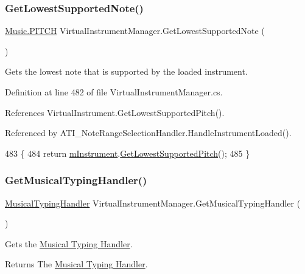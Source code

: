 \subsubsection{\texorpdfstring{Get\+Lowest\+Supported\+Note()}{GetLowestSupportedNote()}}
{\footnotesize\ttfamily \hyperlink{group___music_enums_ga508f69b199ea518f935486c990edac1d}{Music.\+P\+I\+T\+CH} Virtual\+Instrument\+Manager.\+Get\+Lowest\+Supported\+Note (\begin{DoxyParamCaption}{ }\end{DoxyParamCaption})}



Gets the lowest note that is supported by the loaded instrument. 



Definition at line 482 of file Virtual\+Instrument\+Manager.\+cs.



References Virtual\+Instrument.\+Get\+Lowest\+Supported\+Pitch().



Referenced by A\+T\+I\+\_\+\+Note\+Range\+Selection\+Handler.\+Handle\+Instrument\+Loaded().


\begin{DoxyCode}
483     \{
484         \textcolor{keywordflow}{return} \hyperlink{group___v_i_m_priv_gaed435d1f9be09864846db4322dc21fd1}{mInstrument}.\hyperlink{group___v_i_base_pub_func_gac42b3915bbfec60b83650abd701d0690}{GetLowestSupportedPitch}();
485     \}
\end{DoxyCode}
\mbox{\label{group___v_i_m_pub_func_gae6701458a23a3f14db90501f871d4d0d}} 
\subsubsection{\texorpdfstring{Get\+Musical\+Typing\+Handler()}{GetMusicalTypingHandler()}}
{\footnotesize\ttfamily \hyperlink{class_musical_typing_handler}{Musical\+Typing\+Handler} Virtual\+Instrument\+Manager.\+Get\+Musical\+Typing\+Handler (\begin{DoxyParamCaption}{ }\end{DoxyParamCaption})}

Gets the \hyperlink{class_musical_typing_handler}{Musical Typing Handler}. \begin{DoxyReturn}{Returns}
The \hyperlink{class_musical_typing_handler}{Musical Typing Handler}. 
\end{DoxyReturn}



